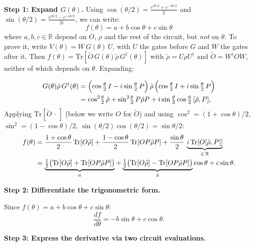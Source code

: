\documentclass[a4paper,11pt]{article}
\begin{document}
\begin{mathbox}
\textbf{Step 1: Expand $G(\theta)$.}
Using $\cos(\theta/2) = \frac{e^{i\theta/2} + e^{-i\theta/2}}{2}$ and
$\sin(\theta/2) = \frac{e^{i\theta/2} - e^{-i\theta/2}}{2i}$, we can write:
\begin{equation}
    f(\theta) = a + b\cos\theta + c\sin\theta
\end{equation}
where $a, b, c \in \mathbb{R}$ depend on $O$, $\rho$ and the rest of
the circuit, but \emph{not} on $\theta$. To prove it, write
$V(\theta) = W\,G(\theta)\,U$, with $U$ the gates before $G$ and $W$ the gates after it.
Then $f(\theta) = \mathrm{Tr}[\tilde O\,G(\theta)\tilde\rho\,G^\dagger(\theta)]$ with
$\tilde\rho = U\rho U^\dagger$ and $\tilde O = W^\dagger O W$, neither of which depends on $\theta$.
Expanding:

\begin{align}
G(\theta)\tilde\rho\,G^\dagger(\theta) &=
    \Bigl(\cos\tfrac{\theta}{2}\,I - i\sin\tfrac{\theta}{2}\,P\Bigr)\,
    \tilde{\rho}\,
    \Bigl(\cos\tfrac{\theta}{2}\,I + i\sin\tfrac{\theta}{2}\,P\Bigr) \notag\\
&= \cos^2\!\tfrac{\theta}{2}\,\tilde{\rho}
   + \sin^2\!\tfrac{\theta}{2}\,P\tilde{\rho}P
   + i\sin\tfrac{\theta}{2}\cos\tfrac{\theta}{2}\,[\tilde{\rho},P], \notag
\end{align}
Applying $\mathrm{Tr}[\tilde O\,\cdot\,]$ (below we write $O$ for $\tilde O$) and using $\cos^2 = (1+\cos\theta)/2$,
$\sin^2 = (1-\cos\theta)/2$, $\sin(\theta/2)\cos(\theta/2) = \sin\theta/2$:
\begin{align}
f(\theta) &= \frac{1+\cos\theta}{2}\,\mathrm{Tr}[O\tilde\rho]
    + \frac{1-\cos\theta}{2}\,\mathrm{Tr}[OP\tilde\rho P]
    + \frac{\sin\theta}{2}\,\underbrace{i\,\mathrm{Tr}[O[\tilde\rho,P]]}_{\in\,\mathbb{R}} \notag\\
&= \underbrace{\tfrac{1}{2}\bigl(\mathrm{Tr}[O\tilde\rho]+\mathrm{Tr}[OP\tilde\rho P]\bigr)}_{a}
   + \underbrace{\tfrac{1}{2}\bigl(\mathrm{Tr}[O\tilde\rho]-\mathrm{Tr}[OP\tilde\rho P]\bigr)}_{b}\cos\theta
   + c\sin\theta. \notag
\end{align}

\textbf{Step 2: Differentiate the trigonometric form.}

Since $f(\theta) = a + b\cos\theta + c\sin\theta$:
\begin{equation}
    \frac{df}{d\theta} = -b\sin\theta + c\cos\theta.
\end{equation}

\textbf{Step 3: Express the derivative via two circuit evaluations.}


\end{mathbox}
\end{document}
